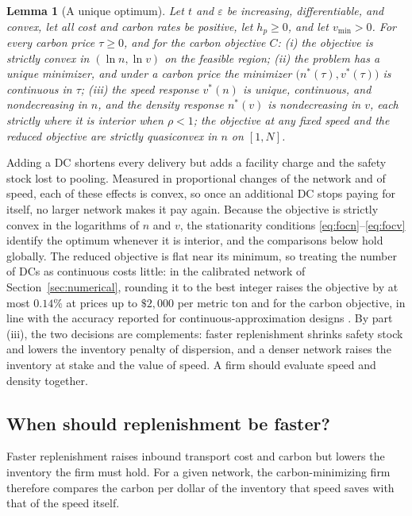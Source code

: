 \documentclass[11pt]{article}
\numberwithin{proposition}{section}
\newtheorem{lemma}[proposition]{Lemma}
\theoremstyle{definition}
\theoremstyle{remark}
\theoremstyle{plain}
\begin{document}
\begin{lemma}[A unique optimum]\label{prop:unique}
Let $t$ and $\varepsilon$ be increasing, differentiable, and convex, let all cost and carbon rates be
positive, let $h_p\ge0$, and let $v_{\min}>0$. For every carbon price $\tau\ge0$, and for the carbon objective $C$:
\textup{(i)} the objective is strictly convex in $(\ln n,\ln v)$ on the feasible region;
\textup{(ii)} the problem has a unique minimizer, and under a carbon price the minimizer
$\big(n^*(\tau),v^*(\tau)\big)$ is continuous in $\tau$;
\textup{(iii)} the speed response $v^*(n)$ is unique, continuous, and nondecreasing in $n$, and the density
response $n^*(v)$ is nondecreasing in $v$, each strictly where it is interior when $\rho<1$; the objective at any
fixed speed and the reduced objective are strictly quasiconvex in $n$ on $[1,N]$.
\end{lemma}

\noindent Adding a DC
shortens every delivery but adds a facility charge and the safety stock lost to pooling. Measured in proportional
changes of the network and of speed, each of these effects is convex, so once an additional DC stops paying
for itself, no larger network makes it pay again. Because the objective is strictly convex in the logarithms of $n$ and $v$, the stationarity conditions
\eqref{eq:focn}--\eqref{eq:focv} identify the optimum whenever it is interior, and the comparisons below hold
globally. The reduced objective is flat near its minimum, so treating the number of DCs as
continuous costs little: in the calibrated network of Section~\ref{sec:numerical}, rounding it to the best integer raises the
objective by at most $0.14\%$ at prices up to $\$2{,}000$ per metric ton and for the carbon objective, in line with the accuracy reported for continuous-approximation designs
\citep{ouyang2006discretization, ansari2018advancements}. By part (iii), the two decisions are complements: faster replenishment shrinks safety stock and lowers the
inventory penalty of dispersion, and a denser network raises the inventory at stake and the value of speed. A firm should evaluate speed and
density together.

\subsection{When should replenishment be faster?}\label{sec:speed}

Faster replenishment raises inbound transport cost and carbon but lowers the inventory the firm must hold. For
a given network, the carbon-minimizing firm therefore compares the carbon per dollar of the inventory that speed
saves with that of the speed itself.
\end{document}
